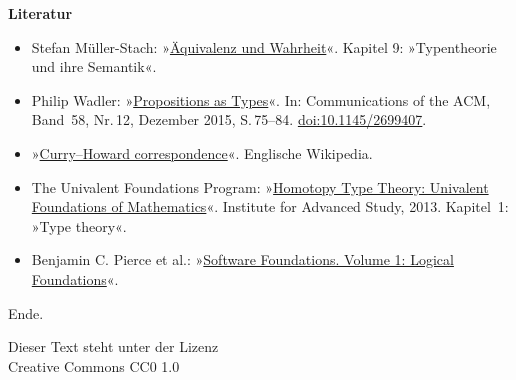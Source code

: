 \documentclass[9pt]{beamer}
\newcommand{\modest}[1]{{\small\color{gray}#1}}
\newcommand{\strong}[1]{\textsf{\textbf{#1}}}
\begin{document}
\begin{frame}
\strong{Literatur}

\begin{itemize}
\item Stefan Müller-Stach: »\href{https://export.arxiv.org/abs/1805.05419}%
{Äquivalenz und Wahrheit}«. Kapitel 9:
»Typentheorie und ihre Semantik«.
\item Philip Wadler:
»\href{https://homepages.inf.ed.ac.uk/wadler/topics/history.html\#propositions-as-types}%
{Propositions as Types}«. In: Communications of the ACM, Band~58, Nr.\,12,
Dezember 2015, S.\,75--84.
\href{http://doi.org/10.1145/2699407}{doi:10.1145/2699407}.
\item »\href{https://en.wikipedia.org/wiki/Curry\%E2\%80\%93Howard_correspondence}%
{Curry--Howard correspondence}«. Englische Wikipedia.
\item The Univalent Foundations Program:
»\href{https://homotopytypetheory.org/book/}%
{Homotopy Type Theory: Univalent Foundations of Mathematics}«.
Institute for Advanced Study, 2013. Kapitel~1: »Type theory«.
\item Benjamin C. Pierce et al.:
»\href{https://softwarefoundations.cis.upenn.edu/lf-current/index.html}%
{Software Foundations. Volume 1: Logical Foundations}«.
\end{itemize}
\end{frame}

\begin{frame}
Ende.

\vfill
\modest{Dieser Text steht unter der Lizenz\\
Creative Commons CC0 1.0}
\end{frame}
\end{document}
